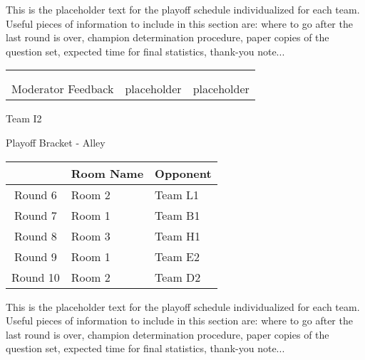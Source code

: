 \documentclass{article}%
\begin{document}
\vspace*{30pt}%
\linebreak%
This is the placeholder text for the playoff schedule individualized for each team. Useful pieces of information to include in this section are: where to go after the last round is over, champion determination procedure, paper copies of the question set, expected time for final statistics, thank{-}you note...%
\vspace*{30pt}%
\newline%
%
\begin{tabularx}{\textwidth}{YYY}%
  &  &  \\%
\\%
Moderator Feedback&placeholder&placeholder\\%
\end{tabularx}%
\newpage%
\begin{center}%
\begin{Huge}%
Team I2%
\end{Huge}%
\vspace*{12pt}%
\linebreak%
\begin{Large}%
Playoff Bracket {-} Alley%
\end{Large}%
\end{center}%
\vspace*{4pt}%
%
\begin{tabularx}{\textwidth}{|c|Y|Y|}%
\hline%
&Room Name&Opponent\\%
\hline%
Round 6&Room 2&Team L1\\%
Round 7&Room 1&Team B1\\%
Round 8&Room 3&Team H1\\%
Round 9&Room 1&Team E2\\%
Round 10&Room 2&Team D2\\%
\hline%
\end{tabularx}%
\vspace*{30pt}%
\linebreak%
This is the placeholder text for the playoff schedule individualized for each team. Useful pieces of information to include in this section are: where to go after the last round is over, champion determination procedure, paper copies of the question set, expected time for final statistics, thank{-}you note...%
\vspace*{30pt}%
\end{document}
